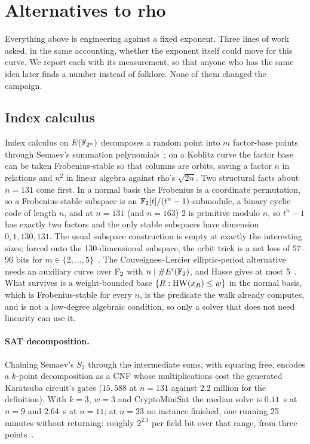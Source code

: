 \section{Alternatives to rho}
\label{sec:alternatives}

Everything above is engineering against a fixed exponent. Three
lines of work asked, in the same accounting, whether the exponent
itself could move for this curve. We report each with its measurement,
so that anyone who has the same idea later finds a number instead of
folklore. None of them changed the campaign.

\subsection{Index calculus}
\label{sec:alt-ic}

Index calculus on $E(\mathbb{F}_{2^n})$ decomposes a random point into $m$
factor-base points through Semaev's summation
polynomials~\cite{semaev2004,gaudry2009,diem2011,faugere2012,petitquisquater2012,galbraithgebregiyorgis2014};
on a Koblitz curve the factor base can be taken Frobenius-stable so
that columns are orbits, saving a factor $n$ in relations and $n^2$ in
linear algebra against rho's $\sqrt{2n}$. Two structural facts about
$n=131$ come first. In a normal basis the Frobenius is a coordinate
permutation, so a Frobenius-stable subspace is an
$\mathbb{F}_2[t]/(t^n-1)$-submodule, a binary cyclic code of length $n$, and
at $n=131$ (and $n=163$) $2$ is primitive modulo $n$, so $t^n-1$ has
exactly two factors and the only stable subspaces have dimension
$0,1,130,131$. The usual subspace construction is empty at exactly the interesting
sizes; forced onto the 130-dimensional subspace, the orbit trick is a
net loss of $57$--$96$ bits for
$m\in\{2,\ldots,5\}$~.
The Couveignes--Lercier elliptic-period alternative needs an auxiliary
curve over $\mathbb{F}_2$ with $n\mid\#E'(\mathbb{F}_2)$, and Hasse gives at most
5~. What survives is a
weight-bounded base $\{R:\operatorname{HW}(x_R)\le w\}$ in the normal basis, which
is Frobenius-stable for every $n$, is the predicate the walk already
computes, and is not a low-degree algebraic condition, so only a
solver that does not need linearity can use it.

\paragraph{SAT decomposition.} Chaining Semaev's $S_3$ through the
intermediate sums, with squaring free, encodes a $k$-point
decomposition as a CNF whose multiplications cost the generated
Karatsuba circuit's gates ($15{,}588$ at $n=131$ against $2.2$ million for the definition). With $k=3$, $w=3$ and CryptoMiniSat the median solve is $0.11$~s at
$n=9$ and $2.64$~s at $n=11$; at $n=23$ no instance finished, one
running 25 minutes without returning: roughly $2^{2.3}$ per field bit
over that range, from three points~.

